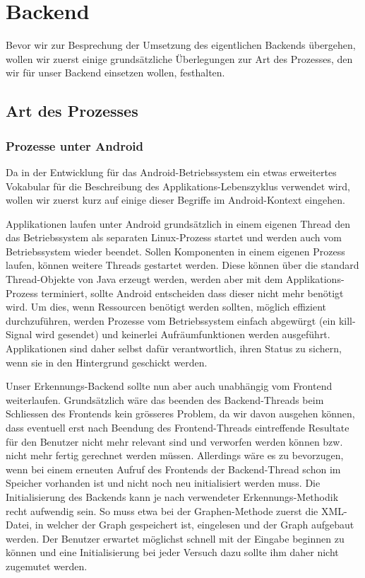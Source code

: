 \chapter{Backend}

Bevor wir zur Besprechung der Umsetzung des eigentlichen Backends übergehen, wollen wir zuerst einige grundsätzliche Überlegungen zur Art des Prozesses, den wir für unser Backend einsetzen wollen, festhalten.

\section{Art des Prozesses}\label{lbl_prozess_art}

\subsection{Prozesse unter Android}\label{lbl_be_procandroid}

Da in der Entwicklung für das Android-Betriebssystem ein etwas erweitertes Vokabular für die Beschreibung des Applikations-Lebenszyklus verwendet wird, wollen wir zuerst kurz auf einige dieser Begriffe im Android-Kontext eingehen.

Applikationen laufen unter Android grundsätzlich in einem eigenen Thread den das Betriebssystem als separaten Linux-Prozess startet und werden auch vom Betriebssystem wieder beendet. Sollen Komponenten in einem eigenen Prozess laufen, können weitere Threads gestartet werden\cite{adglc}. Diese können über die standard Thread-Objekte von Java erzeugt werden, werden aber mit dem Applikations-Prozess terminiert, sollte Android entscheiden dass dieser nicht mehr benötigt wird. Um dies, wenn Ressourcen benötigt werden sollten, möglich effizient durchzuführen, werden Prozesse vom Betriebssystem einfach abgewürgt (ein kill-Signal wird gesendet) und keinerlei Aufräumfunktionen werden ausgeführt. Applikationen sind daher selbst dafür verantwortlich, ihren Status zu sichern, wenn sie in den Hintergrund geschickt werden\cite{adbmt}.

Unser Erkennungs-Backend sollte nun aber auch unabhängig vom Frontend weiterlaufen. Grundsätzlich wäre das beenden des Backend-Threads beim Schliessen des Frontends kein grösseres Problem, da wir davon ausgehen können, dass eventuell erst nach Beendung des Frontend-Threads eintreffende Resultate für den Benutzer nicht mehr relevant sind und verworfen werden können bzw. nicht mehr fertig gerechnet werden müssen. Allerdings wäre es zu bevorzugen, wenn bei einem erneuten Aufruf des Frontends der Backend-Thread schon im Speicher vorhanden ist und nicht noch neu initialisiert werden muss. Die Initialisierung des Backends kann je nach verwendeter Erkennungs-Methodik recht aufwendig sein. So muss etwa bei der Graphen-Methode zuerst die XML-Datei, in welcher der Graph gespeichert ist, eingelesen und der Graph aufgebaut werden. Der Benutzer erwartet möglichst schnell mit der Eingabe beginnen zu können und eine Initialisierung bei jeder Versuch dazu sollte ihm daher nicht zugemutet werden.


